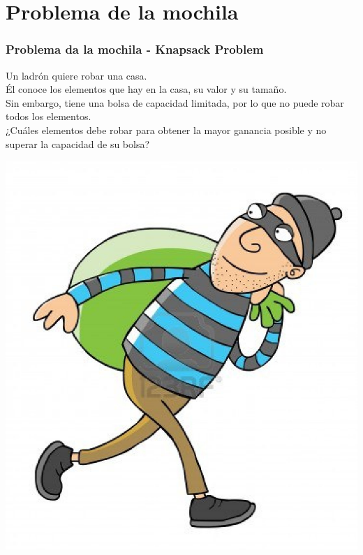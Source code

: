 \documentclass{beamer}
\begin{document}
\section{Problema de la mochila}
	\begin{frame}
		\frametitle{Problema da la mochila - Knapsack Problem}
		Un ladrón quiere robar una casa.\\
		Él conoce los elementos que hay en la casa, su valor y su tamaño.\\
		Sin embargo, tiene una bolsa de capacidad limitada, por lo que no puede robar todos los elementos.\\
		¿Cuáles elementos debe robar para obtener la mayor ganancia posible y no superar la capacidad de su bolsa?\\
		\begin{center} \includegraphics[height = 0.4\textheight]{thief.jpg} \end{center}
	\end{frame}
\end{document}
